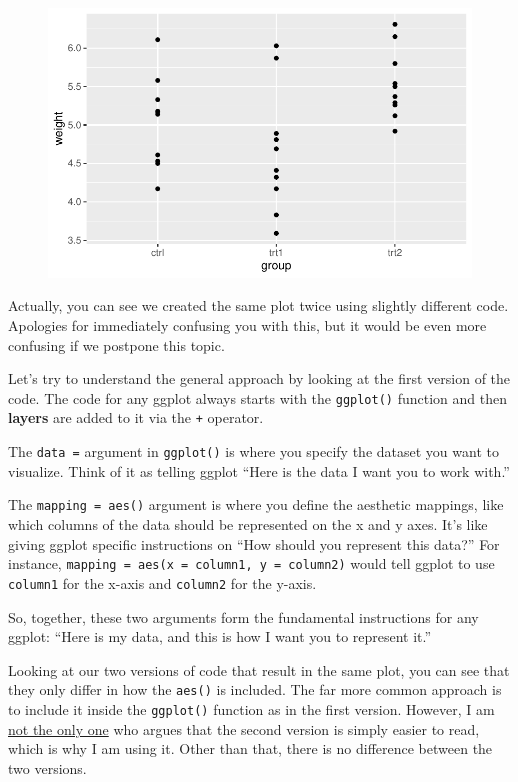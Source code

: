 \documentclass[
  letterpaper,
  DIV=11,
  numbers=noendperiod]{scrartcl}
\begin{document}
\begin{figure}[H]

{\centering \includegraphics{ggplot2intro_files/figure-pdf/unnamed-chunk-4-1.pdf}

}

\end{figure}

Actually, you can see we created the same plot twice using slightly
different code. Apologies for immediately confusing you with this, but
it would be even more confusing if we postpone this topic.

Let's try to understand the general approach by looking at the first
version of the code. The code for any ggplot always starts with the
\texttt{ggplot()} function and then \textbf{layers} are added to it via
the \texttt{+} operator.

The \texttt{data\ =} argument in \texttt{ggplot()} is where you specify
the dataset you want to visualize. Think of it as telling ggplot ``Here
is the data I want you to work with.''

The \texttt{mapping\ =\ aes()} argument is where you define the
aesthetic mappings, like which columns of the data should be represented
on the x and y axes. It's like giving ggplot specific instructions on
``How should you represent this data?'' For instance,
\texttt{mapping\ =\ aes(x\ =\ column1,\ y\ =\ column2)} would tell
ggplot to use \texttt{column1} for the x-axis and \texttt{column2} for
the y-axis.

So, together, these two arguments form the fundamental instructions for
any ggplot: ``Here is my data, and this is how I want you to represent
it.''

Looking at our two versions of code that result in the same plot, you
can see that they only differ in how the \texttt{aes()} is included. The
far more common approach is to include it inside the \texttt{ggplot()}
function as in the first version. However, I am
\href{https://twitter.com/sharoz/status/1559925104645136386}{not the
only one} who argues that the second version is simply easier to read,
which is why I am using it. Other than that, there is no difference
between the two versions.
\end{document}
